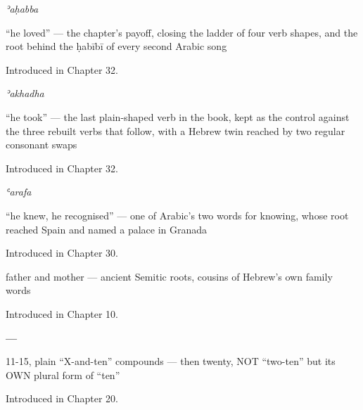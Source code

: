 \noindent\begin{minipage}[t]{\linewidth}
\raggedright
\textbf{}\enspace\emph{ʾaḥabba}\par
\small \textquotedblleft{}he loved\textquotedblright{} — the chapter's payoff, closing the ladder of four verb shapes, and the root behind the ḥabībī of every second Arabic song\par
\footnotesize Introduced in Chapter 32.
\end{minipage}\par\medskip

\noindent\begin{minipage}[t]{\linewidth}
\raggedright
\textbf{}\enspace\emph{ʾakhadha}\par
\small \textquotedblleft{}he took\textquotedblright{} — the last plain-shaped verb in the book, kept as the control against the three rebuilt verbs that follow, with a Hebrew twin reached by two regular consonant swaps\par
\footnotesize Introduced in Chapter 32.
\end{minipage}\par\medskip

\noindent\begin{minipage}[t]{\linewidth}
\raggedright
\textbf{}\enspace\emph{ʿarafa}\par
\small \textquotedblleft{}he knew, he recognised\textquotedblright{} — one of Arabic's two words for knowing, whose root reached Spain and named a palace in Granada\par
\footnotesize Introduced in Chapter 30.
\end{minipage}\par\medskip

\noindent\begin{minipage}[t]{\linewidth}
\raggedright
\textbf{ }\par
\small father and mother — ancient Semitic roots, cousins of Hebrew's own family words\par
\footnotesize Introduced in Chapter 10.
\end{minipage}\par\medskip

\noindent\begin{minipage}[t]{\linewidth}
\raggedright
\textbf{  — }\par
\small 11-15, plain \textquotedblleft{}X-and-ten\textquotedblright{} compounds — then twenty, NOT \textquotedblleft{}two-ten\textquotedblright{} but its OWN plural form of \textquotedblleft{}ten\textquotedblright{}\par
\footnotesize Introduced in Chapter 20.
\end{minipage}\par\medskip

